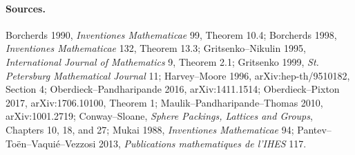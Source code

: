 \paragraph{Sources.}
Borcherds 1990, \emph{Inventiones Mathematicae} 99, Theorem 10.4;
Borcherds 1998, \emph{Inventiones Mathematicae} 132, Theorem 13.3;
Gritsenko--Nikulin 1995, \emph{International Journal of Mathematics} 9,
Theorem 2.1; Gritsenko 1999, \emph{St. Petersburg Mathematical
Journal} 11; Harvey--Moore 1996, arXiv:hep-th/9510182, Section 4;
Oberdieck--Pandharipande 2016, arXiv:1411.1514; Oberdieck--Pixton
2017, arXiv:1706.10100, Theorem 1; Maulik--Pandharipande--Thomas 2010,
arXiv:1001.2719; Conway--Sloane, \emph{Sphere Packings, Lattices and
Groups}, Chapters 10, 18, and 27; Mukai 1988, \emph{Inventiones
Mathematicae} 94; Pantev--To\"en--Vaqui\'e--Vezzosi 2013,
\emph{Publications mathematiques de l'IHES} 117.
